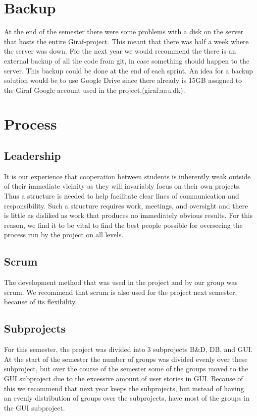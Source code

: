 \section{Backup}
At the end of the semester there were some problems with a disk on the server that hosts the entire Giraf-project. This meant that there was half a week where the server was down. For the next year we would recommend the there is an external backup of all the code from git, in case something should happen to the server. This backup could be done at the end of each sprint. An idea for a backup solution would be to use Google Drive since there already is 15GB assigned to the Giraf Google account used in the project.(giraf\@lists.aau.dk).  

\section{Process}

\subsection{Leadership}
It is our experience that cooperation between students is inherently weak outside of their immediate vicinity as they will invariably focus on their own projects. Thus a structure is needed to help facilitate clear lines of communication and responsibility. Such a structure requires work, meetings, and oversight and there is little as disliked as work that produces no immediately obvious results.
For this reason, we find it to be vital to find the best people possible for overseeing the process run by the project on all levels.

\subsection{Scrum}
The development method that was used in the project and by our group was scrum. We recommend that scrum is also used for the project next semester, because of its flexibility.

\subsection{Subprojects}
For this semester, the project was divided into 3 subprojects B\&D, DB, and GUI. At the start of the semester the number of groups was divided evenly over these subproject, but over the course of the semester some of the groups moved to the GUI subproject due to the excessive amount of user stories in GUI. Because of this we recommend that next year keeps the subprojects, but instead of having an evenly distribution of groups over the subprojects, have most of the groups in the GUI subproject.

